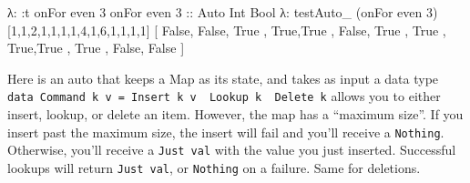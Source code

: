 \documentclass[]{article}
\newenvironment{Shaded}{}{}
\newcommand{\DataTypeTok}[1]{\textcolor[rgb]{0.56,0.13,0.00}{{#1}}}
\newcommand{\DecValTok}[1]{\textcolor[rgb]{0.25,0.63,0.44}{{#1}}}
\newcommand{\OtherTok}[1]{\textcolor[rgb]{0.00,0.44,0.13}{{#1}}}
\newcommand{\FunctionTok}[1]{\textcolor[rgb]{0.02,0.16,0.49}{{#1}}}
\newcommand{\NormalTok}[1]{{#1}}
\begin{document}
\begin{Shaded}
\begin{Highlighting}[]
\NormalTok{λ}\FunctionTok{:} \FunctionTok{:}\NormalTok{t onFor even }\DecValTok{3}
\NormalTok{onFor even }\DecValTok{3}\OtherTok{ ::} \DataTypeTok{Auto} \DataTypeTok{Int} \DataTypeTok{Bool}
\NormalTok{λ}\FunctionTok{:} \NormalTok{testAuto_ (onFor even }\DecValTok{3}\NormalTok{) [}\DecValTok{1}\NormalTok{,}\DecValTok{1}\NormalTok{,}\DecValTok{2}\NormalTok{,}\DecValTok{1}\NormalTok{,}\DecValTok{1}\NormalTok{,}\DecValTok{1}\NormalTok{,}\DecValTok{1}\NormalTok{,}\DecValTok{4}\NormalTok{,}\DecValTok{1}\NormalTok{,}\DecValTok{6}\NormalTok{,}\DecValTok{1}\NormalTok{,}\DecValTok{1}\NormalTok{,}\DecValTok{1}\NormalTok{,}\DecValTok{1}\NormalTok{]}
\NormalTok{[ }\DataTypeTok{False}\NormalTok{, }\DataTypeTok{False}\NormalTok{, }\DataTypeTok{True} \NormalTok{, }\DataTypeTok{True}\NormalTok{,}\DataTypeTok{True}
\NormalTok{, }\DataTypeTok{False}\NormalTok{, }\DataTypeTok{True} \NormalTok{, }\DataTypeTok{True} \NormalTok{, }\DataTypeTok{True}\NormalTok{,}\DataTypeTok{True}
\NormalTok{, }\DataTypeTok{True} \NormalTok{, }\DataTypeTok{False}\NormalTok{, }\DataTypeTok{False} \NormalTok{]}
\end{Highlighting}
\end{Shaded}

Here is an auto that keeps a Map as its state, and takes as input a data type
\texttt{data\ Command\ k\ v\ =\ Insert\ k\ v\ \textbar{}\ Lookup\ k\ \textbar{}\ Delete\ k} allows
you to either insert, lookup, or delete an item. However, the map has a ``maximum size''. If you
insert past the maximum size, the insert will fail and you'll receive a \texttt{Nothing}. Otherwise,
you'll receive a \texttt{Just\ val} with the value you just inserted. Successful lookups will return
\texttt{Just\ val}, or \texttt{Nothing} on a failure. Same for deletions.
\end{document}
